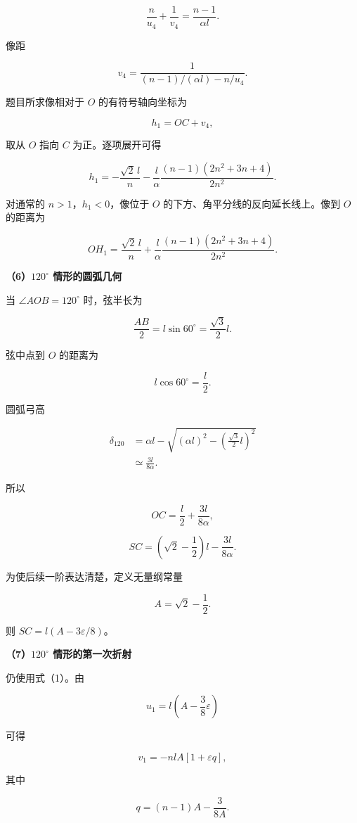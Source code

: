 \documentclass[12pt,a4paper,UTF8]{ctexart}
\begin{document}
\[
\frac n{u_4}+\frac1{v_4}
=\frac{n-1}{\alpha l}.
\tag{15}
\]

像距

\[
v_4
=\frac1{(n-1)/(\alpha l)-n/u_4}.
\tag{16}
\]

题目所求像相对于 \(O\) 的有符号轴向坐标为

\[
h_1=OC+v_4,
\tag{17}
\]

取从 \(O\) 指向 \(C\) 为正。逐项展开可得

\[
\boxed{
h_1
=-\frac{\sqrt2\,l}{n}
-\frac l\alpha
\frac{(n-1)(2n^2+3n+4)}{2n^2}
}.
\tag{18}
\]

对通常的 \(n>1\)，\(h_1<0\)，像位于 \(O\)
的下方、角平分线的反向延长线上。像到 \(O\) 的距离为

\[
\boxed{
OH_1
=\frac{\sqrt2\,l}{n}
+\frac l\alpha
\frac{(n-1)(2n^2+3n+4)}{2n^2}
}.
\tag{19}
\]

\textbf{（6）\(120^\circ\) 情形的圆弧几何}

当 \(\angle AOB=120^\circ\) 时，弦半长为

\[
\frac{AB}{2}=l\sin60^\circ=\frac{\sqrt3}{2}l.
\]

弦中点到 \(O\) 的距离为

\[
l\cos60^\circ=\frac l2.
\]

圆弧弓高

\[
\begin{aligned}
\delta_{120}
&=\alpha l
-\sqrt{(\alpha l)^2-\left(\frac{\sqrt3}{2}l\right)^2}\\
&\simeq\frac{3l}{8\alpha}.
\end{aligned}
\tag{20}
\]

所以

\[
\boxed{
OC=\frac l2+\frac{3l}{8\alpha}
},
\tag{21}
\]

\[
\boxed{
SC
=\left(\sqrt2-\frac12\right)l
-\frac{3l}{8\alpha}
}.
\tag{22}
\]

为使后续一阶表达清楚，定义无量纲常量

\[
A=\sqrt2-\frac12.
\tag{23}
\]

则 \(SC=l(A-3\varepsilon/8)\)。

\textbf{（7）\(120^\circ\) 情形的第一次折射}

仍使用式（1）。由

\[
u_1=l\left(A-\frac38\varepsilon\right)
\]

可得

\[
\boxed{
v_1
=-nlA
\left[
1+\varepsilon q
\right]
},
\tag{24}
\]

其中

\[
\boxed{
q=(n-1)A-\frac{3}{8A}
}.
\tag{25}
\]
\end{document}
